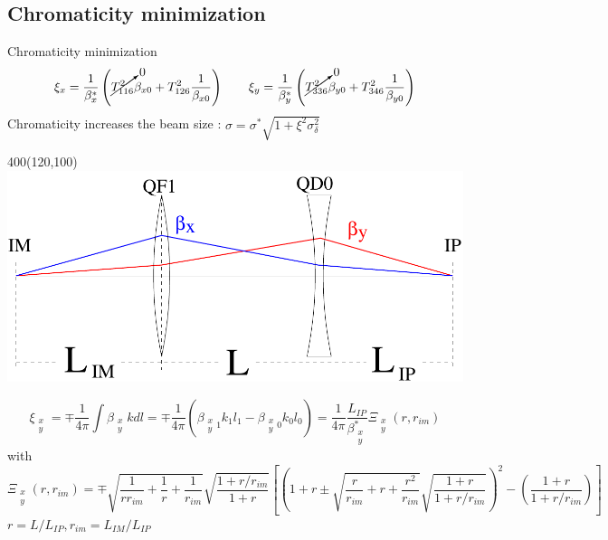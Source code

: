 \documentclass{beamer}
\begin{document}
\subsection{Chromaticity minimization}
\begin{frame}{Chromaticity minimization}
\begin{equation*}
 \xi_x = \frac{1}{\beta_x^*}\left(\cancelto{0}{T_{116}^2}\beta_{x0}+T_{126}^2\frac{1}{\beta_{x0}}\right)\qquad
 \xi_y = \frac{1}{\beta_y^*}\left(\cancelto{0}{T_{336}^2}\beta_{y0}+T_{346}^2\frac{1}{\beta_{y0}}\right)
\end{equation*}
Chromaticity increases the beam size : $\sigma = \sigma^* \sqrt{1+\xi^2\sigma_\delta^2}$
 \setlength{\TPHorizModule}{1pt}
  \setlength{\TPVertModule}{1pt}
\begin{textblock}{400}(120,100)
 \includegraphics[scale=0.25,angle=0]{fig01.pdf}
\end{textblock} 
\vspace*{2.2cm}
\begin{equation*}
  \xi_{\substack{x\\y}}=\mp\frac{1}{4\pi}\int\beta_{\substack{x\\y}}kdl =\mp\frac{1}{4\pi}\left(\beta_{\substack{x\\y}1}k_1l_1-\beta_{\substack{x\\y}0}k_0l_0\right)
 =\frac{1}{4\pi}\frac{L_{IP}}{\beta^*_{\substack{x\\y}}}\Xi_{\substack{x\\y}}(r,r_{im})
\end{equation*}
with{\tiny
\begin{equation}
 \Xi_{\substack{x\\y}}(r,r_{im})=\mp\sqrt{\frac{1}{rr_{im}}+\frac{1}{r}+\frac{1}{r_{im}}}\sqrt{\frac{1+r/r_{im}}{1+r}}\left[\left(1+r\pm\sqrt{\frac{r}{r_{im}}+r+\frac{r^2}{r_{im}}}\sqrt{\frac{1+r}{1+r/r_{im}}}\right)^2-\left(\frac{1+r}{1+r/r_{im}}\right)\right]
\end{equation}}
$r=L/L_{IP}, r_{im}=L_{IM}/L_{IP}$\par
\end{frame}
\end{document}
